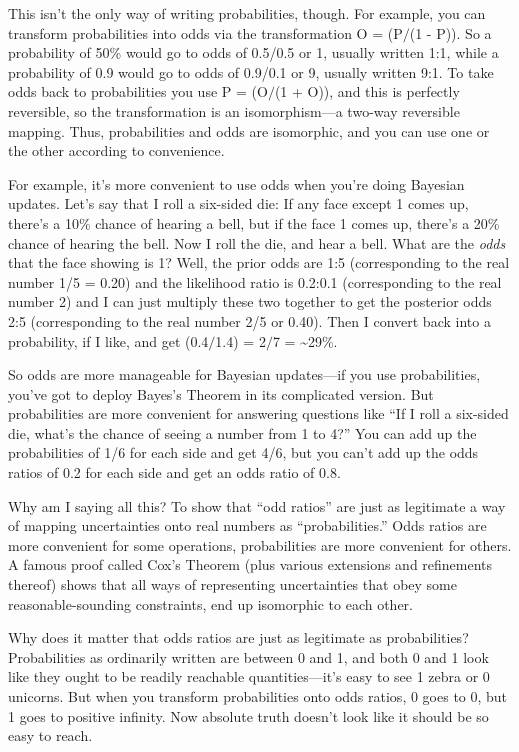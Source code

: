 {
 This isn't the only way of writing probabilities,
though. For example, you can transform probabilities into odds via the
transformation O = (P$/$(1 - P)). So a probability of 50\% would go to
odds of 0.5/0.5 or 1, usually written 1:1, while a probability of 0.9
would go to odds of 0.9/0.1 or 9, usually written 9:1. To take odds
back to probabilities you use P = (O$/$(1 + O)), and this is perfectly
reversible, so the transformation is an isomorphism---a two-way
reversible mapping. Thus, probabilities and odds are isomorphic, and
you can use one or the other according to convenience.}

{
 For example, it's more convenient to use odds when
you're doing Bayesian updates. Let's
say that I roll a six-sided die: If any face except 1 comes up,
there's a 10\% chance of hearing a bell, but if the
face 1 comes up, there's a 20\% chance of hearing the
bell. Now I roll the die, and hear a bell. What are the \textit{odds}
that the face showing is 1? Well, the prior odds are 1:5 (corresponding
to the real number 1/5 = 0.20) and the likelihood ratio is 0.2:0.1
(corresponding to the real number 2) and I can just multiply these two
together to get the posterior odds 2:5 (corresponding to the real
number 2/5 or 0.40). Then I convert back into a probability, if I like,
and get (0.4$/$1.4) = 2$/$7 = \~{}29\%.}

{
 So odds are more manageable for Bayesian updates---if you use
probabilities, you've got to deploy
Bayes's Theorem in its complicated version. But
probabilities are more convenient for answering questions like
``If I roll a six-sided die, what's
the chance of seeing a number from 1 to 4?'' You can
add up the probabilities of 1/6 for each side and get 4/6, but you
can't add up the odds ratios of 0.2 for each side and
get an odds ratio of 0.8.}

{
 Why am I saying all this? To show that ``odd
ratios'' are just as legitimate a way of mapping
uncertainties onto real numbers as
``probabilities.'' Odds ratios are
more convenient for some operations, probabilities are more convenient
for others. A famous proof called Cox's Theorem (plus
various extensions and refinements thereof) shows that all ways of
representing uncertainties that obey some reasonable-sounding
constraints, end up isomorphic to each other.}

{
 Why does it matter that odds ratios are just as legitimate as
probabilities? Probabilities as ordinarily written are between 0 and 1,
and both 0 and 1 look like they ought to be readily reachable
quantities---it's easy to see 1 zebra or 0 unicorns.
But when you transform probabilities onto odds ratios, 0 goes to 0, but
1 goes to positive infinity. Now absolute truth doesn't
look like it should be so easy to reach.}

